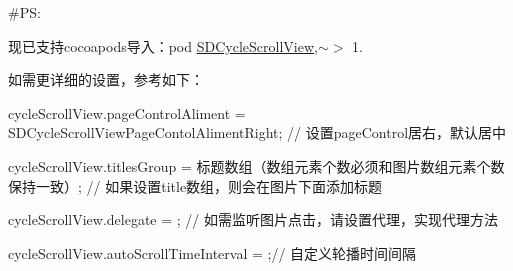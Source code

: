 \#\+PS\+:

现已支持cocoapods导入：pod \textquotesingle{}\mbox{\hyperlink{interface_s_d_cycle_scroll_view}{S\+D\+Cycle\+Scroll\+View}}\textquotesingle{},\textquotesingle{}$\sim$$>$ 1.\textquotesingle{}

如需更详细的设置，参考如下：


\begin{DoxyEnumerate}
\item cycle\+Scroll\+View.\+page\+Control\+Aliment = S\+D\+Cycle\+Scroll\+View\+Page\+Contol\+Aliment\+Right; // 设置page\+Control居右，默认居中
\item cycle\+Scroll\+View.\+titles\+Group = 标题数组（数组元素个数必须和图片数组元素个数保持一致）; // 如果设置title数组，则会在图片下面添加标题
\item cycle\+Scroll\+View.\+delegate = ; // 如需监听图片点击，请设置代理，实现代理方法
\item cycle\+Scroll\+View.\+auto\+Scroll\+Time\+Interval = ;// 自定义轮播时间间隔
\end{DoxyEnumerate}



 